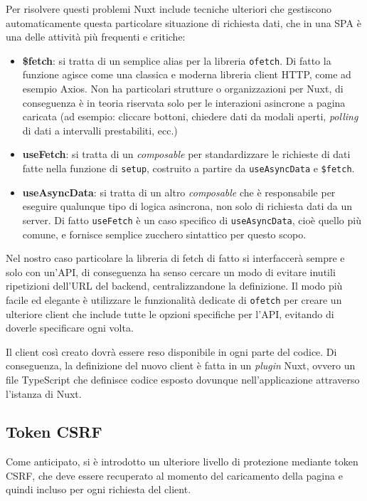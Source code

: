 Per risolvere questi problemi Nuxt include tecniche ulteriori che gestiscono automaticamente questa particolare situazione di richiesta dati, che in una SPA è una delle attività più frequenti e critiche:
\begin{itemize}
    \item \textbf{\$fetch}: si tratta di un semplice alias per la libreria \texttt{ofetch}. Di fatto la funzione agisce come una classica e moderna libreria client HTTP, come ad esempio Axios. Non ha particolari strutture o organizzazioni per Nuxt, di conseguenza è in teoria riservata solo per le interazioni asincrone a pagina caricata (ad esempio: cliccare bottoni, chiedere dati da modali aperti, \emph{polling} di dati a intervalli prestabiliti, ecc.)
    \item \textbf{useFetch}: si tratta di un \emph{composable} per standardizzare le richieste di dati fatte nella funzione di \texttt{setup}, costruito a partire da \texttt{useAsyncData} e \texttt{\$fetch}.
    \item \textbf{useAsyncData}: si tratta di un altro \emph{composable} che è responsabile per eseguire qualunque tipo di logica asincrona, non solo di richiesta dati da un server. Di fatto \texttt{useFetch} è un caso specifico di \texttt{useAsyncData}, cioè quello più comune, e fornisce semplice zucchero sintattico per questo scopo.
\end{itemize}

Nel nostro caso particolare la libreria di fetch di fatto si interfaccerà sempre e solo con un'API, di conseguenza ha senso cercare un modo di evitare inutili ripetizioni dell'URL del backend, centralizzandone la definizione. Il modo più facile ed elegante è utilizzare le funzionalità dedicate di \texttt{ofetch} per creare un ulteriore client che include tutte le opzioni specifiche per l'API, evitando di doverle specificare ogni volta.

Il client così creato dovrà essere reso disponibile in ogni parte del codice. Di conseguenza, la definizione del nuovo client è fatta in un \emph{plugin} Nuxt, ovvero un file TypeScript che definisce codice esposto dovunque nell'applicazione attraverso l'istanza di Nuxt.

\subsection{Token CSRF}
Come anticipato, si è introdotto un ulteriore livello di protezione mediante token CSRF, che deve essere recuperato al momento del caricamento della pagina e quindi incluso per ogni richiesta del client.

